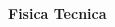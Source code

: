 
\usepackage{lipsum}



\raggedright
\footnotesize
\begin{multicols}{3}

\setlength{\premulticols}{1pt}
\setlength{\postmulticols}{1pt}
\setlength{\multicolsep}{1pt}
\setlength{\columnsep}{2pt}

{\Large{\textbf{Fisica Tecnica}}}



\end{multicols}

